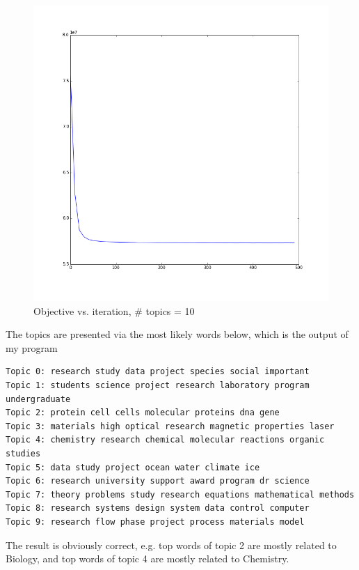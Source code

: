 \documentclass[submit]{harvardml}
\begin{document}
\begin{figure}[h]
    \centering
    \includegraphics[scale=0.45]{prob4.png}
    \caption{Objective vs. iteration, \# topics = 10}
\end{figure}

The topics are presented via the most likely words below, which is the output of my program

\begin{lstlisting}
Topic 0: research study data project species social important
Topic 1: students science project research laboratory program undergraduate
Topic 2: protein cell cells molecular proteins dna gene
Topic 3: materials high optical research magnetic properties laser
Topic 4: chemistry research chemical molecular reactions organic studies
Topic 5: data study project ocean water climate ice
Topic 6: research university support award program dr science
Topic 7: theory problems study research equations mathematical methods
Topic 8: research systems design system data control computer
Topic 9: research flow phase project process materials model
\end{lstlisting}

The result is obviously correct, e.g. top words of topic 2 are mostly related to Biology, and top words of topic 4 are mostly related to Chemistry.
\end{document}
